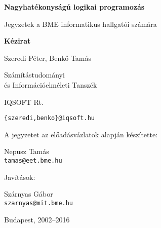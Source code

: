 \vspace*{3cm}
\thispagestyle{empty}

\centerline{\Huge\bf Nagyhatékonyságú logikai programozás}

\vspace{0.5cm}

\centerline{\Large  Jegyzetek a BME informatikus hallgatói számára}
\vspace{1cm}

\centerline{\large\bf Kézirat}
\vfill


\begin{center}
{\Large Szeredi Péter, Benk{\H o} Tamás
	\vspace{0.3cm}
	
	Számítástudományi\\
	és Információelméleti Tanszék
	\vspace{0.3cm}
	
	IQSOFT Rt.}
\vspace{0.3cm}

{\large\tt \{szeredi,benko\}@iqsoft.hu}

\vspace{2cm}

{\large A jegyzetet az előadásvázlatok alapján készítette:\\
	
	\vspace{0.3cm}
	
	\Large Nepusz Tamás \\
	\vspace{0.3cm}
	{\large\tt tamas@eet.bme.hu}
}

{\large Javítások:\\

	\vspace{0.3cm}

	\Large Szárnyas Gábor \\
	\vspace{0.3cm}
	{\large\tt szarnyas@mit.bme.hu}
}
	
\end{center}

\vspace{3cm}

\centerline{\large Budapest, 2002--2016}

\clearpage
